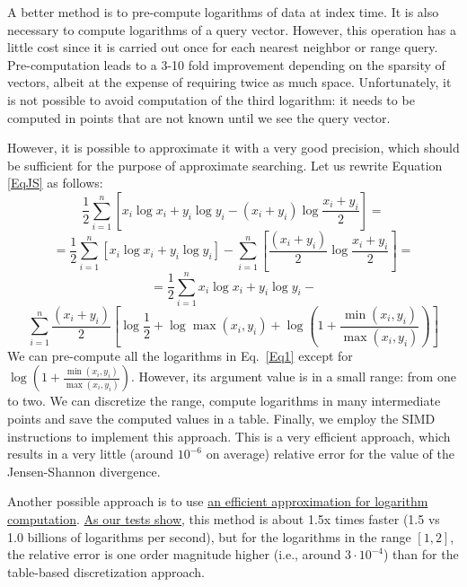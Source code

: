 \documentclass[runningheads,a4paper]{llncs}
\begin{document}
{A better method is to pre-compute logarithms of data at index time. 
It is also necessary to compute logarithms of a query vector.
However, this operation has a little cost since it is carried out once 
for each nearest neighbor or range query.
Pre-computation leads to a 3-10 fold improvement depending on the sparsity of vectors,
albeit at the expense of requiring twice as much space.
Unfortunately, it is not possible to avoid computation of the third logarithm:
it needs to be computed in points that are not known until we see the query vector.

However, it is possible to approximate it with a very good precision,
which should be sufficient for the purpose of approximate searching.
Let us rewrite Equation \ref{EqJS} as follows:
$$
\frac{1}{2}\sum_{i=1}^n\left[ x_i \log x_i + y_i \log y_i  -(x_i+y_i)\log \frac{x_i +y_i}{2}\right]=
$$
$$
 = \frac{1}{2}\sum_{i=1}^n\left[ x_i \log x_i + y_i \log y_i\right]  -
\sum_{i=1}^n\left[\frac{(x_i+y_i)}{2}\log \frac{x_i +y_i}{2} \right]=
$$
$$
 = \frac{1}{2}\sum_{i=1}^n x_i \log x_i + y_i \log y_i  -
$$
\begin{equation}\label{Eq1}
\sum_{i=1}^n\frac{(x_i+y_i)}{2}\left[\log\frac{1}{2} + \log \max(x_i,y_i) + 
\log \left(1 + \frac{\min(x_i,y_i)}{\max(x_i,y_i)}\right) \right]
\end{equation}
We can pre-compute all the logarithms in Eq.~\ref{Eq1} except for $\log \left(1 + \frac{\min(x_i,y_i)}{\max(x_i,y_i)}\right) $. However, its argument value is in a small range: from one to two.
We can discretize the range, compute logarithms in many intermediate points and save the computed values in a table.
Finally, we employ the SIMD instructions to implement this approach. 
This is a very efficient approach, which results in a very little (around $10^{-6}$ on average) relative error for the value of the Jensen-Shannon divergence.

Another possible approach is to use \href{http://fastapprox.googlecode.com/svn/trunk/fastapprox/src/fastonebigheader.h}{an efficient approximation for logarithm computation}.
\href{https://github.com/searchivarius/BlogCode/tree/master/2013/12/26}{As our tests show},
this method is about 1.5x times faster (1.5 vs 1.0 billions of logarithms per second),
but for the logarithms in the range $[1,2]$,
 the relative error is one order magnitude higher (i.e., around $3 \cdot 10^{-4}$)
than for the table-based discretization approach.

}
\end{document}
